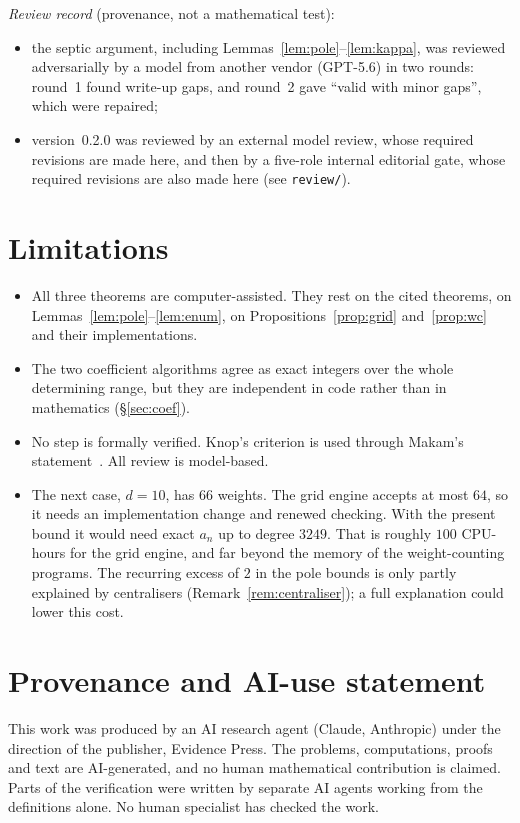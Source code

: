\documentclass[11pt]{amsart}
\theoremstyle{definition}
\theoremstyle{remark}
\begin{document}
\emph{Review record} (provenance, not a mathematical test):
\begin{itemize}
\item the septic argument, including Lemmas~\ref{lem:pole}--\ref{lem:kappa}, was reviewed adversarially by a model from another vendor (GPT-5.6) in two rounds: round~1 found write-up gaps, and round~2 gave ``valid with minor gaps'', which were repaired;
\item version~0.2.0 was reviewed by an external model review, whose required revisions are made here, and then by a five-role internal editorial gate, whose required revisions are also made here (see \texttt{review/}).
\end{itemize}

\section{Limitations}
\begin{itemize}
\item All three theorems are computer-assisted. They rest on the cited theorems, on Lemmas~\ref{lem:pole}--\ref{lem:enum}, on Propositions~\ref{prop:grid} and~\ref{prop:wc} and their implementations.
\item The two coefficient algorithms agree as exact integers over the whole determining range, but they are independent in code rather than in mathematics (\S\ref{sec:coef}).
\item No step is formally verified. Knop's criterion is used through Makam's statement~\cite[Thm.~3.3]{Mak16}. All review is model-based.
\item The next case, $d=10$, has $66$ weights. The grid engine accepts at most $64$, so it needs an implementation change and renewed checking. With the present bound it would need exact $a_n$ up to degree $3249$. That is roughly $100$ CPU-hours for the grid engine, and far beyond the memory of the weight-counting programs. The recurring excess of $2$ in the pole bounds is only partly explained by centralisers (Remark~\ref{rem:centraliser}); a full explanation could lower this cost.
\end{itemize}

\section*{Provenance and AI-use statement}
This work was produced by an AI research agent (Claude, Anthropic) under the direction of the publisher, Evidence Press. The problems, computations, proofs and text are AI-generated, and no human mathematical contribution is claimed. Parts of the verification were written by separate AI agents working from the definitions alone. No human specialist has checked the work.
\end{document}
